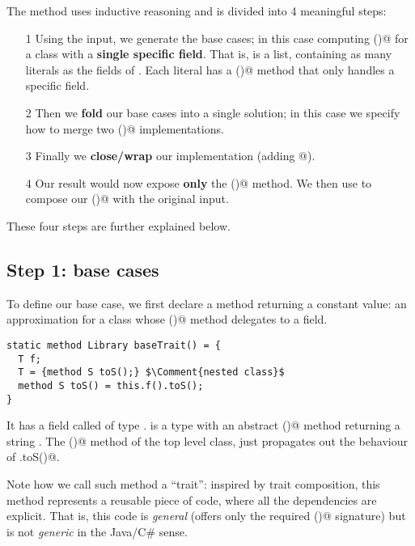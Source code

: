 \noindent
The method uses inductive reasoning and is divided into 4 meaningful steps:
\begin{itemize}
\item[1] Using the input, we generate the base cases;
in this case computing \Q@toS()@ for a class with a \textbf{single specific field}.
That is, \Q@libs@ is a list, containing 
as many \Q@Library@ literals as the fields of \Q@that@.
Each literal has a \Q@toS()@ method that only handles a specific field.
\item[2] Then we  \textbf{fold} our base cases into a single solution; in this case we specify how to merge two \Q@toS()@ implementations.
\item[3] Finally we \textbf{close/wrap} our implementation (adding  \Q@[]@).
\item[4]
Our result \Q@res@ would now expose \textbf{only} the \Q@toS()@ method.
We then use \Q@Override@ to compose our \Q@toS()@ with the original input.
\end{itemize}


\noindent
These four steps are further explained below.

\subsection*{Step 1: base cases}
To define our base case, we first 
 declare a method returning a constant \Q@Library@ value: an approximation for a class
 whose  \Q@toS()@ method delegates to a field.

\begin{lstlisting}
static method Library baseTrait() = {
  T f;
  T = {method S toS();} $\Comment{nested class}$
  method S toS() = this.f().toS();
}
\end{lstlisting}

It has a field called \Q@f@ of type \Q@T@.
\Q@T@ is a type with an abstract \Q@toS()@ method returning a string \Q@S@.
The \Q@toS()@ method of the top level class, just propagates out
the behaviour of \Q@T.toS()@.

Note how we call such method a ``trait'': inspired by trait composition, 
this method represents a reusable piece of code, where all the dependencies are explicit.
That is, this code is \emph{general} (\Q@T@ offers only the required \Q@toS()@ signature)
but is not \emph{generic} in the Java/C\# sense.

